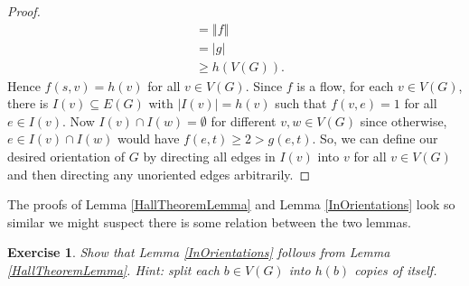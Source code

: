 \documentclass[openany]{tufte-book} %
\theoremstyle{plain}
\newtheorem{exercise}{Exercise}
\newcommand{\card}[1]{\left|#1\right|}
\newcommand{\size}[1]{\left\Vert#1\right\Vert}
\begin{document}
\begin{proof}
\begin{align*}
&=\size{f}\\
&= \card{g}\\
&\ge h(V(G)).
\end{align*}
Hence $f(s,v) = h(v)$ for all $v \in V(G)$.  Since $f$ is a flow, for each $v \in V(G)$, there is $I(v) \subseteq E(G)$ with $\card{I(v)} = h(v)$ such that $f(v, e) = 1$ for all $e \in I(v)$.
Now $I(v) \cap I(w) = \emptyset$ for different $v,w \in V(G)$ since otherwise, $e \in I(v) \cap I(w)$ would have $f(e, t) \ge 2 > g(e, t)$.  So, we can define our desired orientation of $G$
by directing all edges in $I(v)$ into $v$ for all $v \in V(G)$ and then directing any unoriented edges arbitrarily. 
\end{proof}

The proofs of Lemma \ref{HallTheoremLemma} and Lemma \ref{InOrientations} look so similar we might suspect there is some relation between the two lemmas.
\begin{exercise}
Show that Lemma \ref{InOrientations} follows from Lemma \ref{HallTheoremLemma}.  Hint: split each $b \in V(G)$ into $h(b)$ copies of itself.
\end{exercise}
\end{document}
